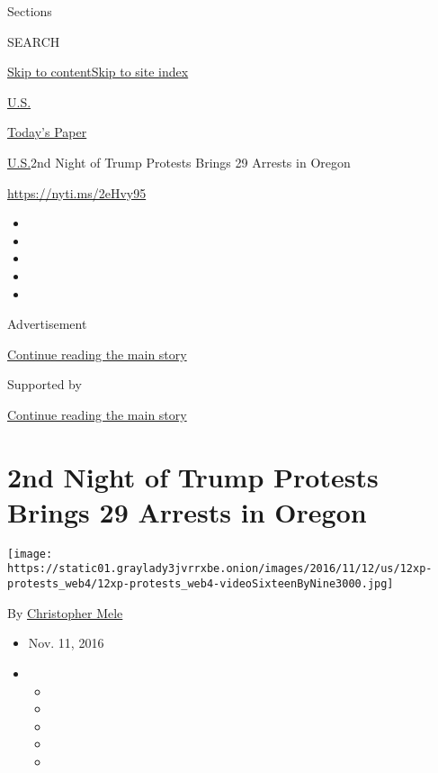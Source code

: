 Sections

SEARCH

\protect\hyperlink{site-content}{Skip to
content}\protect\hyperlink{site-index}{Skip to site index}

\href{https://www.nytimes3xbfgragh.onion/section/us}{U.S.}

\href{https://myaccount.nytimes3xbfgragh.onion/auth/login?response_type=cookie\&client_id=vi}{}

\href{https://www.nytimes3xbfgragh.onion/section/todayspaper}{Today's
Paper}

\href{/section/us}{U.S.}\textbar{}2nd Night of Trump Protests Brings 29
Arrests in Oregon

\url{https://nyti.ms/2eHvy95}

\begin{itemize}
\item
\item
\item
\item
\item
\end{itemize}

Advertisement

\protect\hyperlink{after-top}{Continue reading the main story}

Supported by

\protect\hyperlink{after-sponsor}{Continue reading the main story}

\hypertarget{2nd-night-of-trump-protests-brings-29-arrests-in-oregon}{%
\section{2nd Night of Trump Protests Brings 29 Arrests in
Oregon}\label{2nd-night-of-trump-protests-brings-29-arrests-in-oregon}}

\texttt{[image: https://static01.graylady3jvrrxbe.onion/images/2016/11/12/us/12xp-protests\_web4/12xp-protests\_web4-videoSixteenByNine3000.jpg]}

By
\href{https://www.nytimes3xbfgragh.onion/by/christopher-mele}{Christopher
Mele}

\begin{itemize}
\item
  Nov. 11, 2016
\item
  \begin{itemize}
  \item
  \item
  \item
  \item
  \item
  \end{itemize}
\end{itemize}

